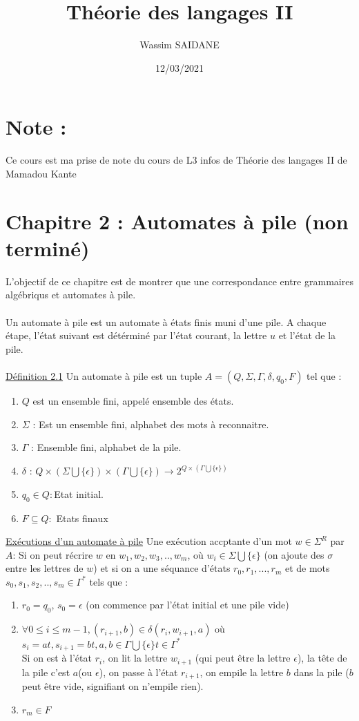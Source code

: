 \documentclass{article}
\title{Théorie des langages II}
\author{Wassim SAIDANE}
\date{12/03/2021}
\begin{document}
    \maketitle
    \section*{Note : }
    Ce cours est ma prise de note du cours de L3 infos de Théorie des langages II de Mamadou Kante
    \section*{Chapitre 2 : Automates à pile (non terminé)}
    L'objectif de ce chapitre est de montrer que une correspondance entre grammaires algébriqus et automates à pile. \\
    \\
    Un automate à pile est un automate à états finis muni d'une pile. A chaque étape, l'état suivant est détérminé par l'état courant, la lettre $u$ et l'état de la pile. \\
    \\
    \underline{Définition 2.1} Un automate à pile est un tuple $A=(Q, \Sigma, \Gamma, \delta, q_0, F)$ tel que : 
    \begin{enumerate}
        \item $Q$ est un ensemble fini, appelé ensemble des états. 
        \item $\Sigma$ : Est un ensemble fini, alphabet des mots à reconnaitre. 
        \item $\Gamma$ : Ensemble fini, alphabet de la pile. 
        \item $\delta$ : $Q \times (\Sigma \bigcup \{\epsilon\}) \times (\Gamma \bigcup \{\epsilon\}) \rightarrow 2^{Q \times (\Gamma \bigcup \{\epsilon\})}$
        \item $q_0 \in Q : $Etat initial. 
        \item $F \subseteq Q :$ Etats finaux 
    \end{enumerate}
    \underline{Exécutions d'un automate à pile}
    Une exécution accptante d'un mot $w \in \Sigma^R$ par $A$: Si on peut récrire $w$ en $w_1,w_2,w_3,..,w_m$, où $w_i \in \Sigma \bigcup \{\epsilon\}$ (on ajoute des $\sigma$ entre les lettres de $w$) et si on a une séquance d'états $r_0,r_1,...,r_m$ et de mots $s_0,s_1,s_2,..,s_m \in \Gamma^*$ tels que : \\
    \begin{enumerate}
        \item $r_0=q_0$, $s_0=\epsilon$ (on commence par l'état initial et une pile vide)
        \item $\forall 0 \le i \le m-1, (r_{i+1},b) \in \delta (r_i, w_{i+1}, a)$ où $s_i=at, s_{i+1}=bt, a,b \in \Gamma \bigcup \{\epsilon\} t \in \Gamma^*$ \\
        Si on est à l'état $r_i$, on lit la lettre $w_{i+1}$ (qui peut être la lettre $\epsilon$), la tête de la pile c'est $a$(ou $\epsilon$), on passe à l'état $r_{i+1}$, on empile la lettre $b$ dans la pile ($b$ peut être vide, signifiant on n'empile rien). \\
        \item $r_m \in F$
    \end{enumerate}
\end{document}
